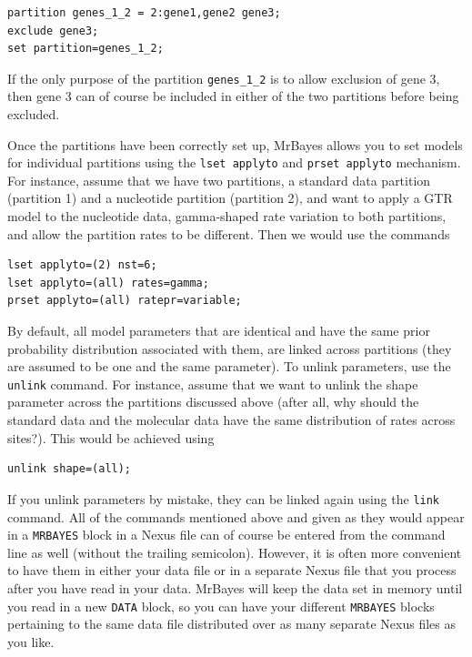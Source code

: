 \documentclass[12pt]{book}
\newcommand{\ttt}[1]{\texttt{#1}}
\begin{document}
\begin{singlespacing}
\small
\begin{verbatim}
partition genes_1_2 = 2:gene1,gene2 gene3;
exclude gene3;
set partition=genes_1_2;
\end{verbatim}
\normalsize
\end{singlespacing}

If the only purpose of the partition \ttt{genes\_1\_2} is to allow exclusion of gene 3, then gene 3
can of course be included in either of the two partitions before being excluded.

Once the partitions have been correctly set up, MrBayes allows you to set models for individual
partitions using the \ttt{lset applyto} and \ttt{prset applyto} mechanism. For instance, assume
that we have two partitions, a standard data partition (partition 1) and a nucleotide partition
(partition 2), and want to apply a GTR model to the nucleotide data, gamma-shaped rate variation to
both partitions, and allow the partition rates to be different. Then we would use the commands

\begin{singlespacing}
\small
\begin{verbatim}
lset applyto=(2) nst=6;
lset applyto=(all) rates=gamma;
prset applyto=(all) ratepr=variable;
\end{verbatim}
\normalsize
\end{singlespacing}

By default, all model parameters that are identical and have the same prior probability
distribution associated with them, are linked across partitions (they are assumed to be one and the
same parameter). To unlink parameters, use the \ttt{unlink} command. For instance, assume that we
want to unlink the shape parameter across the partitions discussed above (after all, why should the
standard data and the molecular data have the same distribution of rates across sites?). This would
be achieved using

\begin{singlespacing}
\small
\begin{verbatim}
unlink shape=(all);
\end{verbatim}
\normalsize
\end{singlespacing}

If you unlink parameters by mistake, they can be linked again using the \ttt{link} command. All of
the commands mentioned above and given as they would appear in a \ttt{MRBAYES} block in a Nexus
file can of course be entered from the command line as well (without the trailing semicolon).
However, it is often more convenient to have them in either your data file or in a separate Nexus
file that you process after you have read in your data. MrBayes will keep the data set in memory
until you read in a new \ttt{DATA} block, so you can have your different \ttt{MRBAYES} blocks
pertaining to the same data file distributed over as many separate Nexus files as you like.
\end{document}
